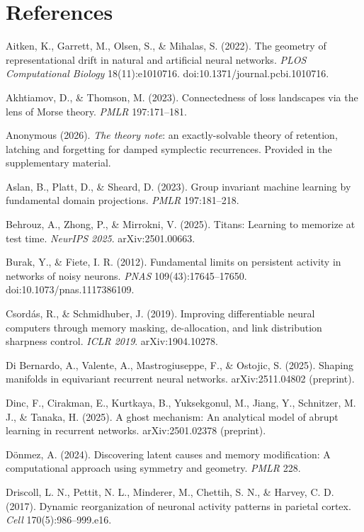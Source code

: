 \documentclass{article}
\begin{document}
\section*{References}
{
\begingroup
\setlength{\parindent}{-0.22in}\setlength{\leftskip}{0.22in}\setlength{\parskip}{\smallskipamount}

Aitken, K., Garrett, M., Olsen, S., \& Mihalas, S. (2022). The geometry of representational drift in natural and artificial neural networks. \emph{PLOS Computational Biology} 18(11):e1010716. doi:10.1371/journal.pcbi.1010716.\par
Akhtiamov, D., \& Thomson, M. (2023). Connectedness of loss landscapes via the lens of Morse theory. \emph{PMLR} 197:171--181.\par
Anonymous (2026). \emph{The theory note}: an exactly-solvable theory of retention, latching and forgetting for damped symplectic recurrences. Provided in the supplementary material.\par
Aslan, B., Platt, D., \& Sheard, D. (2023). Group invariant machine learning by fundamental domain projections. \emph{PMLR} 197:181--218.\par
Behrouz, A., Zhong, P., \& Mirrokni, V. (2025). Titans: Learning to memorize at test time. \emph{NeurIPS 2025}. arXiv:2501.00663.\par
Burak, Y., \& Fiete, I. R. (2012). Fundamental limits on persistent activity in networks of noisy neurons. \emph{PNAS} 109(43):17645--17650. doi:10.1073/pnas.1117386109.\par
Csord\'as, R., \& Schmidhuber, J. (2019). Improving differentiable neural computers through memory masking, de-allocation, and link distribution sharpness control. \emph{ICLR 2019}. arXiv:1904.10278.\par
Di Bernardo, A., Valente, A., Mastrogiuseppe, F., \& Ostojic, S. (2025). Shaping manifolds in equivariant recurrent neural networks. arXiv:2511.04802 (preprint).\par
Dinc, F., Cirakman, E., Kurtkaya, B., Yuksekgonul, M., Jiang, Y., Schnitzer, M. J., \& Tanaka, H. (2025). A ghost mechanism: An analytical model of abrupt learning in recurrent networks. arXiv:2501.02378 (preprint).\par
D\"onmez, A. (2024). Discovering latent causes and memory modification: A computational approach using symmetry and geometry. \emph{PMLR} 228.\par
Driscoll, L. N., Pettit, N. L., Minderer, M., Chettih, S. N., \& Harvey, C. D. (2017). Dynamic reorganization of neuronal activity patterns in parietal cortex. \emph{Cell} 170(5):986--999.e16.\par
}
\end{document}
